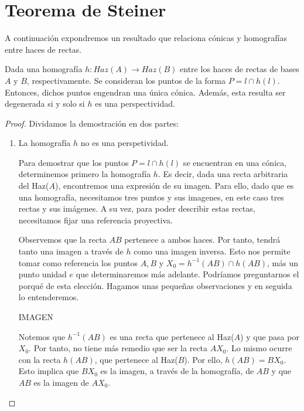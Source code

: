 \section{Teorema de Steiner}
A continuación expondremos un resultado que relaciona cónicas y homografías entre haces de rectas.
\begin{theo}
	\label{C8_teo_steiner}
	Dada una homografía $h:Haz(A)\rightarrow Haz(B)$ entre los haces de rectas de bases $A$ y $B$, respectivamente. Se consideran los puntos de la forma $P=l\cap h(l)$. Entonces, dichos puntos engendran una única cónica. Además, esta resulta ser degenerada si y solo si $h$ es una perspectividad.
\end{theo}
\begin{proof}Dividamos la demostración en dos partes:
	\begin{enumerate}
		\item La homografía $h$ no es una perspetividad.
		
		Para demostrar que los puntos $P=l\cap h(l)$ se encuentran en una cónica, determinemos primero la homografía $h$. Es decir, dada una recta arbitraria del Haz($A$), encontremos una expresión de su imagen. Para ello, dado que es una homografía, necesitamos tres puntos y sus imagenes, en este caso tres rectas y sus imágenes. A su vez, para poder describir estas rectas, necesitamos fijar una referencia proyectiva.
		
		Observemos que la recta $AB$ pertenece a ambos haces. Por tanto, tendrá tanto una imagen a través de $h$ como una imagen inversa. Esto nos permite tomar como referencia los puntos $A,B$ y $X_0=h^{-1}(AB)\cap h(AB)$, más un punto unidad $e$ que determinaremos más adelante. Podríamos preguntarnos el porqué de esta elección. Hagamos unas pequeñas observaciones y en seguida lo entenderemos.
		
		IMAGEN
		
		Notemos que $h^{-1}(AB)$ es una recta que pertenece al Haz($A$) y que pasa por $X_0$. Por tanto, no tiene más remedio que ser la recta $AX_0$. Lo mismo ocurre con la recta $h(AB)$, que pertenece al Haz($B$). Por ello, $h(AB)=BX_0$. Esto implica que $BX_0$ es la imagen, a través de la homografía, de $AB$ y que $AB$ es la imagen de $AX_0$. 
		

\end{enumerate}
\end{proof}
